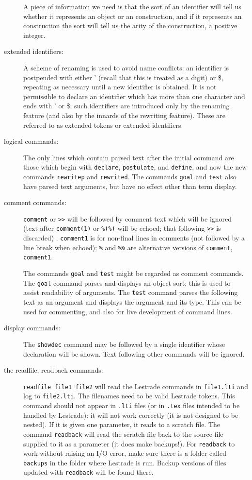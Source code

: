 \documentclass[12pt]{article}
\begin{document}
\begin{description}
A piece of information we need is that the sort of an identifier will tell us whether it represents an object or an construction, and if it represents an construction the sort will tell us the arity of the construction, a positive integer.

\item[extended identifiers:]  A scheme of renaming is used to avoid name conflicts:  an identifier is postpended with either ' (recall that this is treated as a digit) or \$, repeating as necessary until a new identifier is obtained.  It is not permissible to declare an identifier which has more than one character and ends with ' or \$:  such identifiers are introduced only by the renaming feature (and also by the innards of the rewriting feature).  These are referred to as extended tokens or extended identifiers.

\item[logical commands:]  The only lines which contain parsed text after the initial command are those which begin with {\tt declare}, {\tt postulate}, and {\tt define}, and now the new commands
{\tt rewritep} and {\tt rewrited}.  The commands {\tt goal} and {\tt test} also have parsed text arguments, but have no effect other than term display.

\item[comment commands:]  {\tt comment} or {\tt >>} will be followed by comment
text which will be ignored (text after {\tt comment(1)} or {\tt \%(\%)} will be echoed; that following {\tt >>} is discarded) .   {\tt comment1} is for non-final lines in comments (not followed by a line break when echoed);
{\tt \%} and {\tt \%\%} are alternative versions of {\tt comment}, {\tt comment1}.

The commands {\tt goal} and {\tt test} might be regarded as comment commands.  The {\tt goal} command parses and displays an object sort:  this is used to assist readability
of arguments.  The {\tt test} command parses the following text as an argument and displays the argument and its type.  This can be used for commenting, and also for live development of command lines.

\item[display commands:]  The {\tt showdec} command may be followed by a single identifier whose declaration will be shown.  Text following other commands will be ignored.

\item[the readfile, readback commands:]  {\tt readfile file1 file2}  will read the Lestrade commands in {\tt file1.lti} and log to {\tt file2.lti}.  The filenames need to be valid Lestrade tokens.  This command should not appear in {\tt .lti} files (or in {\tt .tex} files intended to be handled by Lestrade):  it will not work correctly (it is not designed to be nested).   If it is given one parameter, it reads to a scratch file.  The command {\tt readback} will read the scratch file back to the source file supplied to it as a parameter (it does make backups!).  For {\tt readback} to work without raising an I/O error, make sure there is a folder called {\tt backups} in the folder where Lestrade is run.  Backup versions of files updated with {\tt readback} will be found there.


\end{description}
\end{document}
